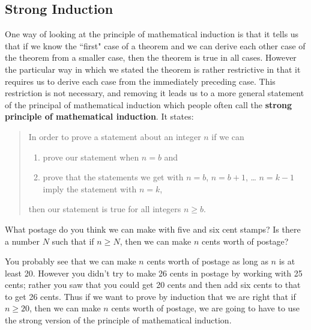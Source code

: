 \subsection{Strong Induction}
One way of looking at the principle of mathematical induction is that it
tells us that if we know the ``first" case of a theorem and we can derive
each other case of the theorem from a smaller case, then the theorem is
true in all cases.  However the particular way in which we stated the
theorem is rather restrictive in that it requires us to derive each
case from the immediately preceding case.  This restriction is
not necessary, and removing it leads us to a more general statement of
the principal of mathematical induction which people often call the {\bf
strong principle of mathematical induction}.  It states:
\begin{quote}In order to prove a
statement about an integer $n$ if we can
\begin{enumerate}
\item prove our statement when $n=b$ and
\item prove that the statements we get with $n=b$, $n=b+1$, \ldots
$n=k-1$ imply the statement with $n=k$,
\end{enumerate}
then our statement is true for all integers $n\ge b$.
\end{quote} 
\bp
\item What postage do you think we can make with five and six cent
stamps?  Is there a number $N$ such that if $n\ge N$, then we can make
$n$ cents worth of postage?
\ep

You probably see that we can make $n$ cents worth of postage as long as
$n$ is at least 20.  However you didn't try to make 26 cents in postage
by working with 25 cents; rather you saw that you could get 20 cents and
then add six cents to that to get 26 cents.  Thus if we want to prove by
induction that we are right that if $n\ge 20$, then we can make $n$ cents
worth of postage, we are going to have to use the strong version of the
principle of mathematical induction.  

